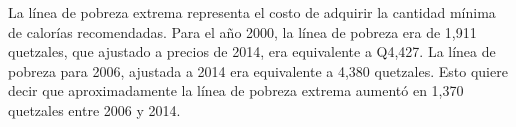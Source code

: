 La línea de pobreza extrema representa el costo de adquirir la cantidad mínima de calorías recomendadas. Para el año 2000, la línea de pobreza era de 1,911 quetzales, que ajustado a precios de 2014, era equivalente a Q4,427. La línea de pobreza para 2006, ajustada a 2014 era equivalente a 4,380 quetzales. Esto quiere decir que aproximadamente la línea de pobreza extrema aumentó en 1,370 quetzales entre 2006 y 2014.  